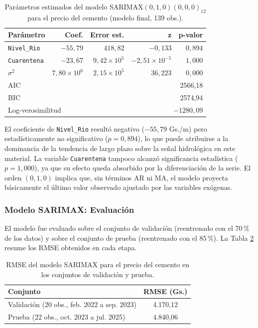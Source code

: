 \begin{table}[H]
    \centering
    \caption{Parámetros estimados del modelo SARIMAX$(0,1,0)(0,0,0)_{12}$ para el precio del cemento (modelo final, 139 obs.).}
    \label{tab:sarimax_params}
    \begin{tabular}{lrrrr}
        \toprule
        \textbf{Parámetro} & \textbf{Coef.} & \textbf{Error est.} & \textbf{z} & \textbf{p-valor} \\
        \midrule
        \texttt{Nivel\_Rio}  & $-55{,}79$ & $418{,}82$ & $-0{,}133$ & $0{,}894$ \\
        \texttt{Cuarentena}  & $-23{,}67$ & $9{,}42 \times 10^{5}$ & $-2{,}51 \times 10^{-5}$ & $1{,}000$ \\
        $\sigma^{2}$         & $7{,}80 \times 10^{6}$ & $2{,}15 \times 10^{5}$ & $36{,}223$ & $0{,}000$ \\
        \midrule
        \multicolumn{2}{l}{AIC} & \multicolumn{3}{r}{2566{,}18} \\
        \multicolumn{2}{l}{BIC} & \multicolumn{3}{r}{2574{,}94} \\
        \multicolumn{2}{l}{Log-verosimilitud} & \multicolumn{3}{r}{$-1280{,}09$} \\
        \bottomrule
    \end{tabular}
\end{table}

\justify
El coeficiente de \texttt{Nivel\_Rio} resultó negativo ($-55{,}79$ Gs./m) pero estadísticamente no significativo ($p = 0{,}894$), lo que puede atribuirse a la dominancia de la tendencia de largo plazo sobre la señal hidrológica en este material. La variable \texttt{Cuarentena} tampoco alcanzó significancia estadística ($p = 1{,}000$), ya que su efecto queda absorbido por la diferenciación de la serie. El orden $(0,1,0)$ implica que, sin términos AR ni MA, el modelo proyecta básicamente el último valor observado ajustado por las variables exógenas.

\subsubsection{Modelo SARIMAX: Evaluación}

\justify
El modelo fue evaluado sobre el conjunto de validación (reentrenado con el 70\,\% de los datos) y sobre el conjunto de prueba (reentrenado con el 85\,\%). La Tabla \ref{tab:sarimax_metricas} resume los RMSE obtenidos en cada etapa.

\begin{table}[H]
    \centering
    \caption{RMSE del modelo SARIMAX para el precio del cemento en los conjuntos de validación y prueba.}
    \label{tab:sarimax_metricas}
    \begin{tabular}{lc}
        \toprule
        \textbf{Conjunto} & \textbf{RMSE (Gs.)} \\
        \midrule
        Validación (20 obs., feb. 2022 a sep. 2023) & 4.170{,}12 \\
        Prueba (22 obs., oct. 2023 a jul. 2025)     & 4.840{,}06 \\
        \bottomrule
    \end{tabular}
\end{table}

